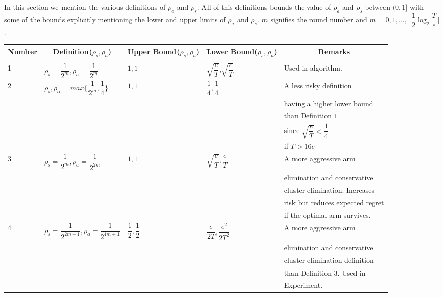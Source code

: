In this section we mention the various definitions of $\rho_{a}$ and $\rho_{s}$. All of this definitions bounds the value of $\rho_{a}$ and $\rho_{s}$ between $(0,1]$ with some of the bounds explicitly mentioning the lower and upper limits of $\rho_{a}$ and $\rho_{s}$. $m$ signifies the round number and $m=0,1,...,\big \lfloor \dfrac{1}{2}\log_{2} \dfrac{T}{e}\big\rfloor$.

\begin{center}
\begin{tabular}{l|l|l|l|l}
\multicolumn{1}{c}{\bf Number} &\multicolumn{1}{c}{\bf Definition($\rho_{s},\rho_{a}$)}  &\multicolumn{1}{c}{\bf Upper Bound($\rho_{s},\rho_{a}$)} &\multicolumn{1}{c}{\bf Lower Bound($\rho_{s},\rho_{a}$)} &\multicolumn{1}{c}{\bf Remarks} \\
\hline \\
1	&$\rho_{s}=\dfrac{1}{2^{m}},\rho_{a}=\dfrac{1}{2^{m}}$         & $1,1$  &$\sqrt{\dfrac{e}{T}}$,$\sqrt{\dfrac{e}{T}}$ & Used in algorithm. \\ 
2	&$\rho_{s},\rho_{a}=max\bigg\lbrace\dfrac{1}{2^{m}},\dfrac{1}{4}\bigg\rbrace$         & $1,1$  &$\dfrac{1}{4},\dfrac{1}{4}$ & A less risky definition \\
&&&& having a higher lower bound \\
&&&& than Definition $1$ \\
&&&& since $\sqrt{\dfrac{e}{T}}< \dfrac{1}{4}$ \\
&&&& if $T> 16e$\\ 
3	&$\rho_{s}=\dfrac{1}{2^{m}},\rho_{a}=\dfrac{1}{2^{2m}}$         & $1,1$  &$\sqrt{\dfrac{e}{T}},\dfrac{e}{T}$ & A more aggressive arm \\&&&& elimination and conservative \\&&&&  cluster elimination. Increases \\&&&& risk but reduces expected regret \\&&&&  if the optimal arm survives.\\ 
4	&$\rho_{s}=\dfrac{1}{2^{2m+1}},\rho_{a}=\dfrac{1}{2^{4m+1}}$         & $\dfrac{1}{2},\dfrac{1}{2}$  &$\dfrac{e}{2T},\dfrac{e^{2}}{2T^{2}}$ & A more aggressive arm \\&&&& elimination and conservative \\&&&&  cluster elimination definition \\&&&& than Definition $3$. Used in \\&&&& Experiment.
\end{tabular}
\end{center}

